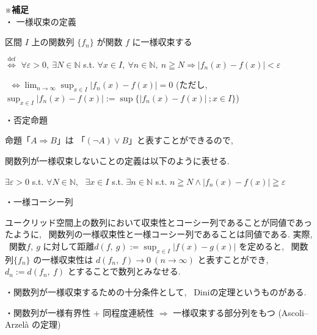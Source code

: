 \documentclass[10pt]{jsarticle}
\begin{document}
\noindent
※\textbf{補足}\\
・ 一様収束の定義

区間 $I$ 上の関数列 $\{f_n\}$ が関数 $f$ に一様収束する

$\overset{\mathrm{def}}{\iff}$
$\forall \varepsilon > 0, \ \exists N \in \mathbb{N}$ s.t. $\forall x \in I, \ \forall n \in \mathbb{N}, \ n \geqq N \Longrightarrow |f_n(x) - f(x)| < \varepsilon$

 \ $\Longleftrightarrow \displaystyle \lim_{n \to \infty} \sup_{x \in I} |f_n (x) - f(x) | = 0$ \qquad
(ただし, \ $\displaystyle \sup_{x \in I} |f_n (x) - f(x) | := \sup \{|f_n (x) - f(x) | \ ; x \in I \}$)

\bigskip

\noindent
・否定命題

命題「$A \Rightarrow B$」は 「$(\neg A) \lor B$」と表すことができるので, 

関数列が一様収束しないことの定義は以下のように表せる.

$\exists \varepsilon > 0$ s.t. $\forall N \in \mathbb{N}$, \  $\exists x \in I$ s.t. $\exists n \in \mathbb{N}$ s.t. $n \geqq N \land |f_n(x) - f(x)| \geqq \varepsilon$

\bigskip

\noindent
・一様コーシー列

ユークリッド空間上の数列において収束性とコーシー列であることが同値であったように, \ 関数列の一様収束性と一様コーシー列であることは同値である. 実際, \ 関数$f, \ g$ に対して距離$d(f, \ g) := \displaystyle \sup_{x \in I} |f(x) - g(x)|$ を定めると, \ 関数列$\{f_n\}$ の一様収束性は $d(f_n, \ f) \to 0 \ (n \to \infty)$ と表すことができ, \ $d_n := d(f_n, \ f)$ とすることで数列とみなせる.

\bigskip

\noindent
・関数列が一様収束するための十分条件として, \ Diniの定理というものがある.

\bigskip

\noindent
・関数列が一様有界性 + 同程度連続性 $\Longrightarrow$ 一様収束する部分列をもつ \quad (Ascoli–Arzelà の定理)
\end{document}
